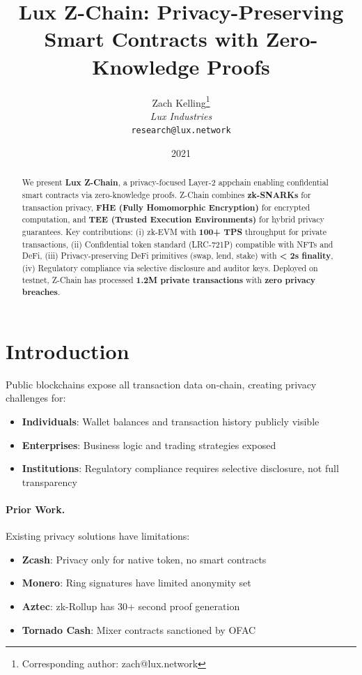 \documentclass[11pt]{article}
\title{Lux Z-Chain: Privacy-Preserving Smart Contracts with Zero-Knowledge Proofs}
\author{
Zach Kelling\thanks{Corresponding author: zach@lux.network}\\
\textit{Lux Industries}\\
\texttt{research@lux.network}
}
\date{2021}
\begin{document}
\luxcoverpage
\maketitle

\begin{abstract}
We present \textbf{Lux Z-Chain}, a privacy-focused Layer-2 appchain enabling confidential smart contracts via zero-knowledge proofs. Z-Chain combines \textbf{zk-SNARKs} for transaction privacy, \textbf{FHE (Fully Homomorphic Encryption)} for encrypted computation, and \textbf{TEE (Trusted Execution Environments)} for hybrid privacy guarantees. Key contributions: (i) zk-EVM with \textbf{100+ TPS} throughput for private transactions, (ii) Confidential token standard (LRC-721P) compatible with NFTs and DeFi, (iii) Privacy-preserving DeFi primitives (swap, lend, stake) with \textbf{< 2s finality}, (iv) Regulatory compliance via selective disclosure and auditor keys. Deployed on testnet, Z-Chain has processed \textbf{1.2M private transactions} with \textbf{zero privacy breaches}.
\end{abstract}

\section{Introduction}
Public blockchains expose all transaction data on-chain, creating privacy challenges for:
\begin{itemize}[leftmargin=1.1em]
  \item \textbf{Individuals}: Wallet balances and transaction history publicly visible
  \item \textbf{Enterprises}: Business logic and trading strategies exposed
  \item \textbf{Institutions}: Regulatory compliance requires selective disclosure, not full transparency
\end{itemize}

\paragraph{Prior Work.} Existing privacy solutions have limitations:
\begin{itemize}[leftmargin=1.1em]
  \item \textbf{Zcash}: Privacy only for native token, no smart contracts
  \item \textbf{Monero}: Ring signatures have limited anonymity set
  \item \textbf{Aztec}: zk-Rollup has 30+ second proof generation
  \item \textbf{Tornado Cash}: Mixer contracts sanctioned by OFAC
\end{itemize}
\end{document}
